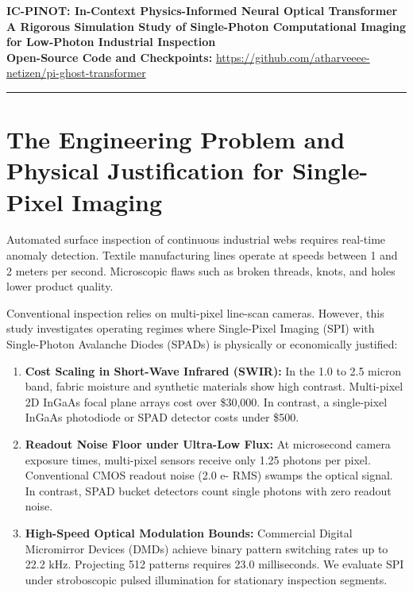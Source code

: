 \documentclass[10pt,a4paper]{article}
\begin{document}
\begin{center}
    {\LARGE \textbf{IC-PINOT: In-Context Physics-Informed Neural Optical Transformer}}\\[4pt]
    {\large \textbf{A Rigorous Simulation Study of Single-Photon Computational Imaging for Low-Photon Industrial Inspection}}\\[6pt]
    \textbf{Open-Source Code and Checkpoints:} \url{https://github.com/atharveeee-netizen/pi-ghost-transformer}
\end{center}
\vspace{-4pt}
\hrule
\vspace{6pt}

\section{The Engineering Problem and Physical Justification for Single-Pixel Imaging}
Automated surface inspection of continuous industrial webs requires real-time anomaly detection. Textile manufacturing lines operate at speeds between 1 and 2 meters per second. Microscopic flaws such as broken threads, knots, and holes lower product quality. 

Conventional inspection relies on multi-pixel line-scan cameras. However, this study investigates operating regimes where Single-Pixel Imaging (SPI) with Single-Photon Avalanche Diodes (SPADs) is physically or economically justified:
\begin{enumerate}
    \setlength\itemsep{-2pt}
    \item \textbf{Cost Scaling in Short-Wave Infrared (SWIR):} In the 1.0 to 2.5 micron band, fabric moisture and synthetic materials show high contrast. Multi-pixel 2D InGaAs focal plane arrays cost over \$30,000. In contrast, a single-pixel InGaAs photodiode or SPAD detector costs under \$500.
    \item \textbf{Readout Noise Floor under Ultra-Low Flux:} At microsecond camera exposure times, multi-pixel sensors receive only 1.25 photons per pixel. Conventional CMOS readout noise (2.0 e- RMS) swamps the optical signal. In contrast, SPAD bucket detectors count single photons with zero readout noise.
    \item \textbf{High-Speed Optical Modulation Bounds:} Commercial Digital Micromirror Devices (DMDs) achieve binary pattern switching rates up to 22.2 kHz. Projecting 512 patterns requires 23.0 milliseconds. We evaluate SPI under stroboscopic pulsed illumination for stationary inspection segments.
\end{enumerate}
\end{document}
